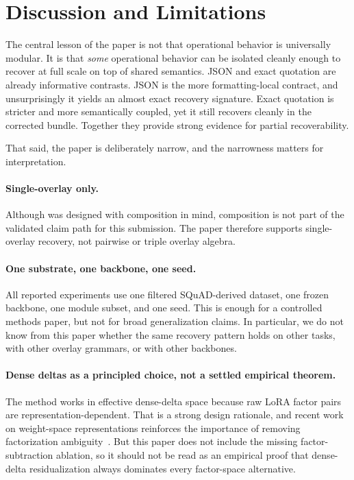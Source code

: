 
\section{Discussion and Limitations}
\label{sec:discussion}

The central lesson of the paper is not that operational behavior is universally modular. It is that \emph{some} operational behavior can be isolated cleanly enough to recover at full scale on top of shared semantics. JSON and exact quotation are already informative contrasts. JSON is the more formatting-local contract, and unsurprisingly it yields an almost exact recovery signature. Exact quotation is stricter and more semantically coupled, yet it still recovers cleanly in the corrected bundle. Together they provide strong evidence for partial recoverability.

That said, the paper is deliberately narrow, and the narrowness matters for interpretation.

\paragraph{Single-overlay only.}
Although \method{} was designed with composition in mind, composition is not part of the validated claim path for this submission. The paper therefore supports single-overlay recovery, not pairwise or triple overlay algebra.

\paragraph{One substrate, one backbone, one seed.}
All reported experiments use one filtered SQuAD-derived dataset, one frozen backbone, one module subset, and one seed. This is enough for a controlled methods paper, but not for broad generalization claims. In particular, we do not know from this paper whether the same recovery pattern holds on other tasks, with other overlay grammars, or with other backbones.

\paragraph{Dense deltas as a principled choice, not a settled empirical theorem.}
The method works in effective dense-delta space because raw LoRA factor pairs are representation-dependent. That is a strong design rationale, and recent work on weight-space representations reinforces the importance of removing factorization ambiguity~\citep{han2026w2t}. But this paper does not include the missing factor-subtraction ablation, so it should not be read as an empirical proof that dense-delta residualization always dominates every factor-space alternative.

